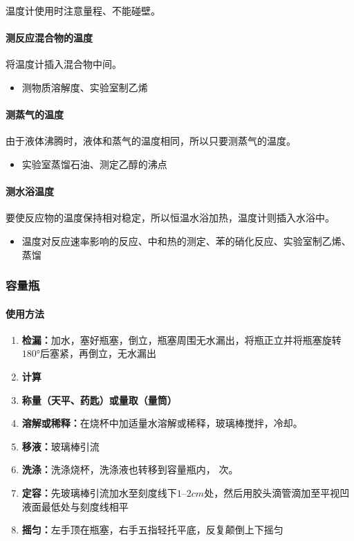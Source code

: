 \documentclass[10pt]{article}
\begin{document}
	温度计使用时注意量程、不能碰壁。
	
	\paragraph{测反应混合物的温度}
	
	将温度计插入混合物中间。
	
	\begin{itemize}
		\item 测物质溶解度、实验室制乙烯
	\end{itemize}
	
	\paragraph{测蒸气的温度}
	
	由于液体沸腾时，液体和蒸气的温度相同，所以只要测蒸气的温度。
	
	\begin{itemize}
		\item 实验室蒸馏石油、测定乙醇的沸点
	\end{itemize}
	
	\paragraph{测水浴温度}
	
	要使反应物的温度保持相对稳定，所以恒温水浴加热，温度计则插入水浴中。
	
	\begin{itemize}
		\item 温度对反应速率影响的反应、中和热的测定、苯的硝化反应、实验室制乙烯、蒸馏
	\end{itemize}
	
	\subsubsection{容量瓶}
	\paragraph{使用方法}
	\begin{enumerate}
		\item \textbf{检漏：}加水，塞好瓶塞，倒立，瓶塞周围无水漏出，将瓶正立并将瓶塞旋转$\ang{180}$后塞紧，再倒立，无水漏出
		\item \textbf{计算}
		\item \textbf{称量（天平、药匙）或量取（量筒）}
		\item \textbf{溶解或稀释：}在烧杯中加适量水溶解或稀释，玻璃棒搅拌，冷却。
		\item \textbf{移液：}玻璃棒引流
		\item \textbf{洗涤：}洗涤烧杯，洗涤液也转移到容量瓶内， 次。
		\item \textbf{定容：}先玻璃棒引流加水至刻度线下$1\text{--}2cm$处，然后用胶头滴管滴加至平视凹液面最低处与刻度线相平
		\item \textbf{摇匀：}左手顶在瓶塞，右手五指轻托平底，反复颠倒上下摇匀
	\end{enumerate}
\end{document}
